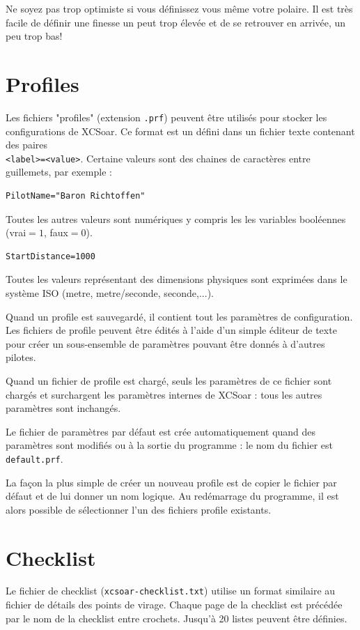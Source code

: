 \tip Ne soyez pas trop optimiste si vous définissez vous même votre polaire. Il est très facile de définir une finesse un peut trop élevée et de se retrouver en arrivée, un peu trop bas!
\section{Profiles}

Les fichiers "profiles" (extension \verb|.prf|) peuvent être utilisés pour stocker les configurations de XCSoar. Ce format est un défini dans un  fichier texte contenant des paires\\ \verb|<label>=<value>|. Certaine valeurs sont des chaines de caractères entre guillemets, par exemple :
\begin{verbatim}
PilotName="Baron Richtoffen"
\end{verbatim}
Toutes les autres valeurs sont numériques y compris les les variables booléennes (vrai$=1$, faux$=0$). 
\begin{verbatim}
StartDistance=1000
\end{verbatim}

Toutes les valeurs représentant des dimensions physiques sont exprimées dans le système ISO (metre, metre/seconde, seconde,...).

Quand un profile est sauvegardé, il contient tout les paramètres de configuration. Les fichiers de profile peuvent être édités à l'aide d'un simple éditeur de texte pour créer un sous-ensemble de paramètres pouvant être donnés à d'autres pilotes.

Quand un fichier de profile est chargé, seuls les paramètres de ce fichier sont chargés et surchargent les paramètres internes de XCSoar : tous les autres paramètres sont inchangés.

Le fichier de paramètres par défaut est crée automatiquement quand des paramètres sont modifiés ou à la sortie du programme : le nom du fichier est \verb|default.prf|.

La façon la plus simple de créer un nouveau profile est de copier le fichier par défaut et de lui donner un nom logique. Au redémarrage du programme, il est alors possible de sélectionner l'un des fichiers profile existants.


\section{Checklist}
Le fichier de checklist (\verb|xcsoar-checklist.txt|) utilise un format similaire au fichier de détails des points de virage. Chaque page de la checklist est précédée par le nom de la checklist entre crochets. Jusqu'à 20 listes peuvent être définies.

